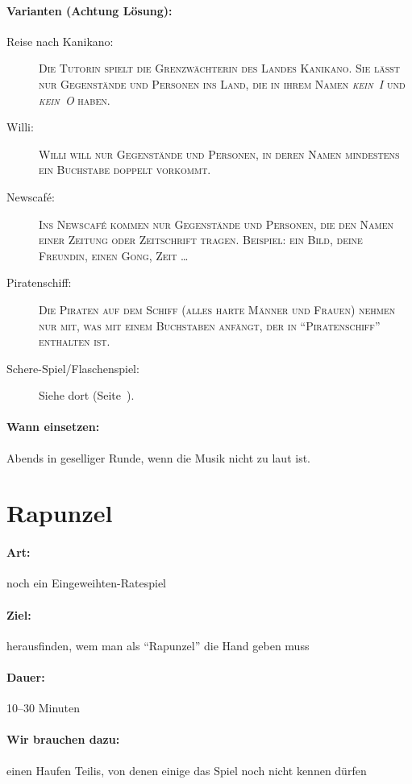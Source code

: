\paragraph{Varianten (Achtung Lösung):}
	\begin{description}
		\item[Reise nach Kanikano:] \textsc{Die Tutorin spielt die Grenzwächterin des Landes Kanikano. Sie lässt nur Gegenstände und Personen ins Land, die in ihrem Namen \emph{kein~I} und \emph{kein~O} haben.}
		\item[Willi:] \textsc{Willi will nur Gegenstände und Personen, in deren Namen mindestens ein Buchstabe doppelt vorkommt.}
		\item[Newscaf\'{e}:] \textsc{Ins Newscaf\'{e} kommen nur Gegenstände und Personen, die den Namen einer Zeitung oder Zeitschrift tragen. Beispiel: ein Bild, deine Freundin, einen Gong, Zeit \ldots}
		\item[Piratenschiff:] \textsc{Die Piraten auf dem Schiff (alles harte Männer und Frauen) nehmen nur mit, was mit einem Buchstaben anfängt, der in "`Piratenschiff"' enthalten ist.}
		\item[Schere-Spiel/Flaschenspiel:] Siehe dort (Seite~\pageref{flaschenspiel}).
	\end{description}
\paragraph{Wann einsetzen:} Abends in geselliger Runde, wenn die Musik nicht zu laut ist.

\section{Rapunzel}
\paragraph{Art:} noch ein Eingeweihten-Ratespiel
\paragraph{Ziel:} herausfinden, wem man als "`Rapunzel"' die Hand geben muss
\paragraph{Dauer:} 10--30 Minuten
\paragraph{Wir brauchen dazu:} einen Haufen Teilis, von denen einige das Spiel noch nicht kennen dürfen

